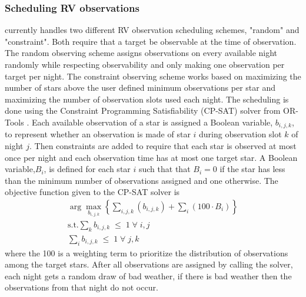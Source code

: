 \subsubsection{Scheduling RV observations}

 currently handles two different RV observation scheduling schemes,
"random" and "constraint". Both require that a target be observable at the time
of observation. The random observing scheme assigns observations on every
available night randomly while respecting observability and only making one
observation per target per night. The constraint observing scheme works based
on maximizing the number of stars above the user defined minimum observations
per star and maximizing the number of observation slots used each night. The
scheduling is done using the Constraint Programming Satisfiability (CP-SAT)
solver from OR-Tools \citep{perronORTools2022}. Each available observation of a
star is assigned a Boolean variable, $b_{i,j,k}$, to represent whether an
observation is made of star $i$ during observation slot $k$ of night $j$. Then
constraints are added to require that each star is observed at most once per
night and each observation time has at most one target star. A Boolean
variable,$B_i$, is defined for each star $i$ such that that $B_i = 0$ if the
star has less than the minimum number of observations assigned and one
otherwise. The objective function given to the CP-SAT solver is
\begin{gather}
  \arg{\max_{b_{i,j,k}}} \left\{ \sum_{i,j,k}\left(
  b_{i,j,k}\right) + \sum_i\left( 100 \cdot B_{i}\right)
  \right\}\\
  \textrm{s.t.}
  \sum_k b_{i,j,k} \; \leq \; 1 \; \forall \; i,j\\
  \sum_i b_{i,j,k} \; \leq \; 1 \; \forall \; j,k
  \label{eq:rv_objective}
\end{gather}
where the 100 is a weighting term to prioritize the distribution of
observations among the target stars. After all observations are assigned by
calling the solver, each night gets a random draw of bad weather, if there is
bad weather then the observations from that night do not occur.

